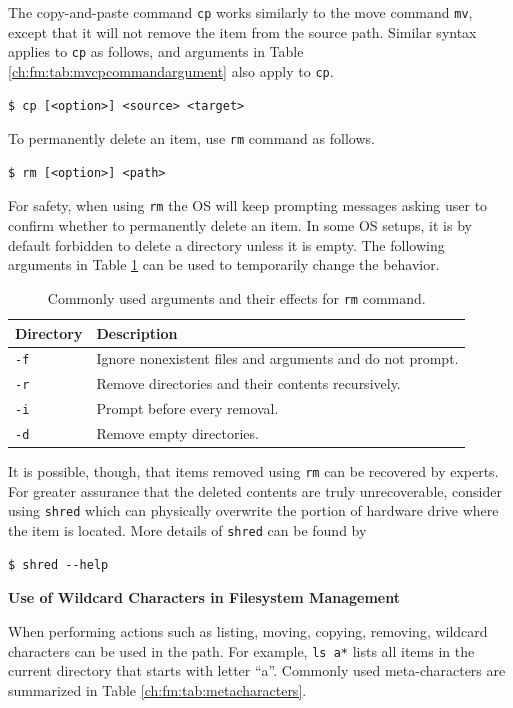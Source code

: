The copy-and-paste command \verb|cp| works similarly to the move command \verb|mv|, except that it will not remove the item from the source path. Similar syntax applies to \verb|cp| as follows, and arguments in Table \ref{ch:fm:tab:mvcpcommandargument} also apply to \verb|cp|.
\begin{lstlisting}
$ cp [<option>] <source> <target>
\end{lstlisting}

To permanently delete an item, use \verb|rm| command as follows.
\begin{lstlisting}
$ rm [<option>] <path>
\end{lstlisting}
For safety, when using \verb|rm| the OS will keep prompting messages asking user to confirm whether to permanently delete an item. In some OS setups, it is by default forbidden to delete a directory unless it is empty. The following arguments in Table \ref{ch:fm:tab:rmcommandargument} can be used to temporarily change the behavior.

\begin{table}[!htb]
  \centering \caption{Commonly used arguments and their effects for \texttt{rm} command.}\label{ch:fm:tab:rmcommandargument}
  \begin{tabularx}{\textwidth}{lX}
    \hline
    Directory & Description \\ \hline
    \verb|-f| & Ignore nonexistent files and arguments and do not prompt. \\ 
    \verb|-r| & Remove directories and their contents recursively. \\ 
    \verb|-i| & Prompt before every removal. \\ 
    \verb|-d| & Remove empty directories. \\
    \hline
  \end{tabularx}
\end{table}

It is possible, though, that items removed using \verb|rm| can be recovered by experts. For greater assurance that the deleted contents are truly unrecoverable, consider using \verb|shred| which can physically overwrite the portion of hardware drive where the item is located. More details of \verb|shred| can be found by
\begin{lstlisting}
$ shred --help
\end{lstlisting}

\begin{mdframed}
\noindent \textbf{Use of Wildcard Characters in Filesystem Management}

When performing actions such as listing, moving, copying, removing, wildcard characters can be used in the path. For example, \verb|ls a*| lists all items in the current directory that starts with letter ``a''. Commonly used meta-characters are summarized in Table \ref{ch:fm:tab:metacharacters}.

\end{mdframed}

